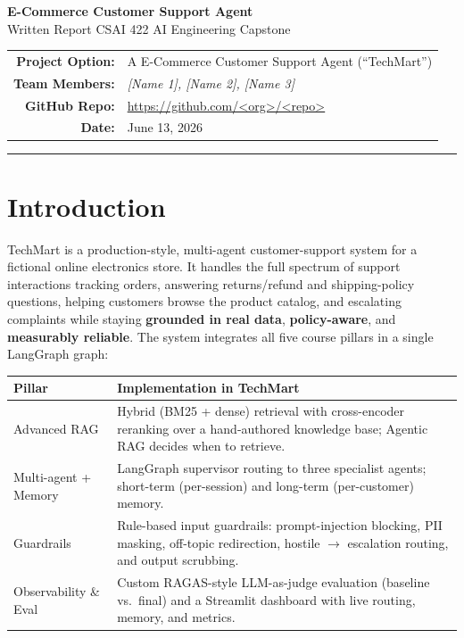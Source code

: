 \documentclass[11pt,a4paper]{article}
\begin{document}
\begin{center}
    {\LARGE\bfseries E-Commerce Customer Support Agent}\\[4pt]
    {\large Written Report \textemdash{} CSAI 422 AI Engineering Capstone}\\[12pt]
    \begin{tabular}{rl}
        \textbf{Project Option:} & A \textemdash{} E-Commerce Customer Support Agent (``TechMart'') \\
        \textbf{Team Members:}   & \textit{[Name 1], [Name 2], [Name 3]} \\
        \textbf{GitHub Repo:}    & \url{https://github.com/<org>/<repo>} \\
        \textbf{Date:}           & June 13, 2026 \\
    \end{tabular}
\end{center}
\vspace{4pt}\hrule\vspace{6pt}

\section{Introduction}

TechMart is a production-style, multi-agent customer-support system for a fictional online
electronics store. It handles the full spectrum of support interactions \textemdash{} tracking
orders, answering returns/refund and shipping-policy questions, helping customers browse the
product catalog, and escalating complaints \textemdash{} while staying \textbf{grounded in real
data}, \textbf{policy-aware}, and \textbf{measurably reliable}. The system integrates all five
course pillars in a single LangGraph graph:

\begin{tabularx}{\textwidth}{@{}>{\raggedright\arraybackslash}p{3.2cm}Y@{}}
\toprule
\textbf{Pillar} & \textbf{Implementation in TechMart} \\
\midrule
Advanced RAG & Hybrid (BM25 + dense) retrieval with cross-encoder reranking over a hand-authored knowledge base; Agentic RAG decides when to retrieve. \\
Multi-agent + Memory & LangGraph supervisor routing to three specialist agents; short-term (per-session) and long-term (per-customer) memory. \\
Guardrails & Rule-based input guardrails: prompt-injection blocking, PII masking, off-topic redirection, hostile $\to$ escalation routing, and output scrubbing. \\
Observability \& Eval & Custom RAGAS-style LLM-as-judge evaluation (baseline vs.\ final) and a Streamlit dashboard with live routing, memory, and metrics. \\
\bottomrule
\end{tabularx}
\end{document}
